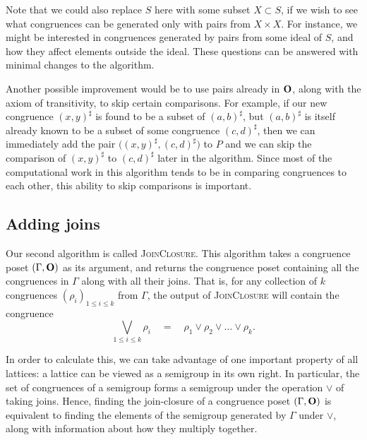 Note that we could also replace $S$ here with some subset $X \subset S$, if we
wish to see what congruences can be generated only with pairs from $X \times X$.
For instance, we might be interested in congruences generated by pairs from some
ideal of $S$, and how they affect elements outside the ideal.  These questions
can be answered with minimal changes to the algorithm.

Another possible improvement would be to use pairs already in $\mathbf{O}$, along with
the axiom of transitivity, to skip certain comparisons.  For example, if our new
congruence $(x,y)^\sharp$ is found to be a subset of $(a,b)^\sharp$, but
$(a,b)^\sharp$ is itself already known to be a subset of some congruence
$(c,d)^\sharp$, then we can immediately add the pair
$\big((x,y)^\sharp, (c,d)^\sharp\big)$ to $P$ and we can skip the comparison of
$(x,y)^\sharp$ to $(c,d)^\sharp$ later in the algorithm.  Since most of the
computational work in this algorithm tends to be in comparing congruences to
each other, this ability to skip comparisons is important.

\subsection{Adding joins}
\label{sec:join-closure}

Our second algorithm is called \textsc{JoinClosure}.  This algorithm takes a
congruence poset $(\Gamma, \mathbf{O})$ as its argument, and returns the congruence
poset containing all the congruences in $\Gamma$ along with all their joins.
That is, for any collection of $k$ congruences
$(\rho_i)_{1 \leq i \leq k}$ from $\Gamma$, the output of
\textsc{JoinClosure} will contain the congruence
$$\bigvee_{1 \leq i \leq k} \rho_i
\quad=\quad \rho_1 \vee \rho_2 \vee \ldots \vee \rho_k.$$

In order to calculate this, we can take advantage of one important property of
all lattices: a lattice can be viewed as a semigroup in its own right.  In
particular, the set of congruences of a semigroup forms a semigroup under the
operation $\vee$ of taking joins.  Hence, finding the join-closure of a
congruence poset $(\Gamma, \mathbf{O})$ is equivalent to finding the elements of the
semigroup generated by $\Gamma$ under $\vee$, along with information about how
they multiply together.

